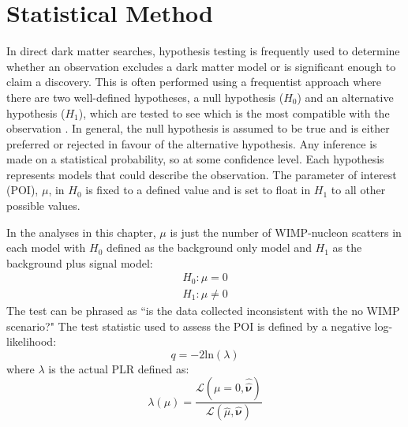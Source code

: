 \section{Statistical Method}

\par
In direct dark matter searches, hypothesis testing is frequently used to determine whether an observation excludes a dark matter model or is significant enough to claim a discovery.
This is often performed using a frequentist approach where there are two well-defined hypotheses, a null hypothesis ($H_0$) and an alternative hypothesis ($H_1$), which are tested to see which is the most compatible with the observation \cite{likelihood_testing_ref}.
In general, the null hypothesis is assumed to be true and is either preferred or rejected in favour of the alternative hypothesis.
Any inference is made on a statistical probability, so at some confidence level.
Each hypothesis represents models that could describe the observation.
The parameter of interest (POI), $\mu$, in $H_0$ is fixed to a defined value and is set to float in $H_1$ to all other possible values.
\par
In the analyses in this chapter, $\mu$ is just the number of WIMP-nucleon scatters in each model with $H_0$ defined as the background only model and $H_1$ as the background plus signal model:
\begin{equation}
    \begin{split}
        H_0: \mu = 0 \\
        H_1: \mu \neq 0
    \end{split}
\end{equation}
The test can be phrased as ``is the data collected inconsistent with the no WIMP scenario?"
The test statistic used to assess the POI is defined by a negative log-likelihood:
\begin{equation}
    q = -2 \text{ln}(\lambda)
\end{equation}
where $\lambda$ is the actual PLR defined as:
\begin{equation}
    \lambda(\mu) = \frac{\mathcal{L}(\mu=0 , \boldsymbol{\hat{\hat{\nu}}})}{\mathcal{L}(\hat{\mu}, \boldsymbol{\hat{\nu}})}
\end{equation}

